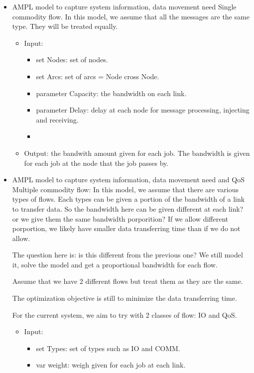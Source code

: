 \documentclass[letter]{article}
\begin{document}
\begin{itemize}
\item AMPL model to capture system information, data movement need
Single commodity flow. In this model, we assume that all the messages are the same type. They will be treated equally.
\begin{itemize}
\item Input:
\begin{itemize}
\item set Nodes: set of nodes.
\item set Arcs: set of arcs = Node cross Node.
\item parameter Capacity: the bandwidth on each link.
\item parameter Delay: delay at each node for message processing, injecting and receiving.
\item 
\end{itemize}
\item Output: the bandwith amount given for each job. The bandwidth is given for each job at the node that the job passes by. 
\end{itemize}

\item AMPL model to capture system information, data movement need and QoS 
Multiple commodity flow: In this model, we assume that there are various types of flows. Each types can be given a portion of the bandwidth of a link to transfer data. So the bandwidth here can be given different at each link? or we give them the same bandwidth porporition? If we allow different porportion, we likely have smaller data transferring time than if we do not allow.

The question here is: is this different from the previous one? We still model it, solve the model and get a proportional bandwidth for each flow.

Assume that we have 2 different flows but treat them as they are the same. 

The optimization objective is still to minimize the data transferring time.

For the current system, we aim to try with 2 classes of flow: IO and QoS.
\begin{itemize}
\item Input:
\begin{itemize}
\item set Types: set of types such as IO and COMM.
\item var weight: weigh given for each job at each link.
\end{itemize}

\end{itemize}
\end{itemize}
\end{document}
